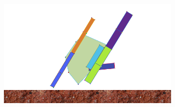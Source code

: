 \begin{figure}[H]
\begin{subfigure}[b]{0.3\textwidth}
          \caption{\label{fig:hupf_2}}
        \end{subfigure}
        \hspace{\fill}
        \begin{subfigure}[b]{0.3\textwidth}
          \includegraphics[width=\linewidth,center]{graphics/simulation-discussion/hupf_3}
          \caption{\label{fig:hupf_3}}
        \end{subfigure}


\end{figure}
